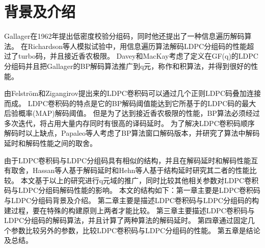 \chapter{背景及介绍}
Gallager在1962年提出低密度校验分组码\parencite{Gallager1963Low}，同时他还提出了一种信息遍历解码算法。
在Richardson等人模拟试验中\parencite{Richardson2001Design}，用信息遍历算法解码LDPC分组码的性能超过了turbo码，并且接近香农极限。
Davey和MacKay考虑了定义在GF(q)的LDPC分组码\parencite{Davey1998Low}并且把Gallager的BP解码算法推广到q元，称作和积算法，并得到很好的性能。

由Felström和Zigangirov\parencite{Felstrom1999Time}提出来的LDPC卷积码可以通过几个正则LDPC码叠加连接而成。
LDPC卷积码的特点是它的BP解码阈值能达到它所基于的LDPC码的最大后验概率(MAP)解码阈值\parencite{Kudekar2010Threshold}。
但是为了达到接近香农极限的性能，BP算法必须经过多次迭代，将占用大量内存同时有很高的译码延时。
为了解决LDPC卷积码顺序解码时以上缺点，Papaleo等人考虑了BP算法窗口解码版本\parencite{Papaleo2010Windowed}，并研究了算法中解码延时和解码性能之间的取舍。

由于LDPC卷积码与LDPC分组码具有相似的结构，并且在解码延时和解码性能互有取舍，Hassan等人基于解码延时\parencite{Ul2012Comparison}和Hehn等人基于结构延时\parencite{Hehn2009LDPC}研究其二者的性能比较。
本文基于以上的研究进行q元域的推广，同时比较其他相关参数对LDPC卷积码与LDPC分组码解码性能的影响。
本文的结构如下：第一章主要是LDPC卷积码与LDPC分组码背景及介绍。
第二章主要是描述LDPC卷积码与LDPC分组码的构建过程，要在特殊的构建原则上两者才能比较。
第三章主要描述LDPC卷积码与LDPC分组码的解码算法，并且计算了两种算法的解码延时。
第四章通过固定几个参数比较另外的参数，比较LDPC卷积码与LDPC分组码的性能。
第五章是结论及总结。